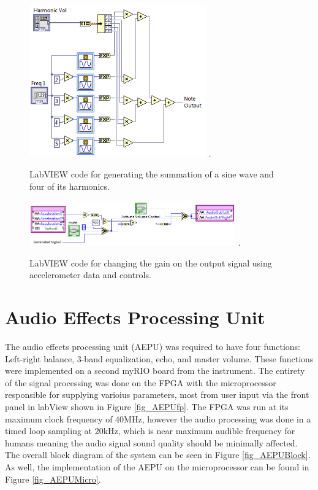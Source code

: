 \begin{figure}[!t]
\centering
\includegraphics[width=3in]{NoteGeneration.png}
\DeclareGraphicsExtensions.
\caption{LabVIEW code for generating the summation of a sine wave and four of its harmonics.}
\label{fig_notegen}
\end{figure} 

\begin{figure}[!t]
\centering
\includegraphics[width=3.5in]{AccelerometerVolume.png}
\DeclareGraphicsExtensions.
\caption{LabVIEW code for changing the gain on the output signal using accelerometer data and controls.}
\label{fig_accvol}
\end{figure} 




\section{Audio Effects Processing Unit}
The audio effects processing unit (AEPU) was required to have four functions: Left-right balance, 3-band equalization, echo, and master volume. 
These functions were implemented on a second myRIO board from the instrument.
The entirety of the signal processing was done on the FPGA with the microprocessor responsible for supplying varioius parameters, most from user input via the front panel in labView shown in Figure \ref{fig_AEPUfp}.
The FPGA was run at its maximum clock frequency of 40MHz, however the audio processing was done in a timed loop sampling at 20kHz, which is near maximum audible frequency for humans meaning the audio signal sound quality should be minimally affected. 
The overall block diagram of the system can be seen in Figure \ref{fig_AEPUBlock}.
As well, the implementation of the AEPU on the microprocessor can be found in Figure \ref{fig_AEPUMicro}.

